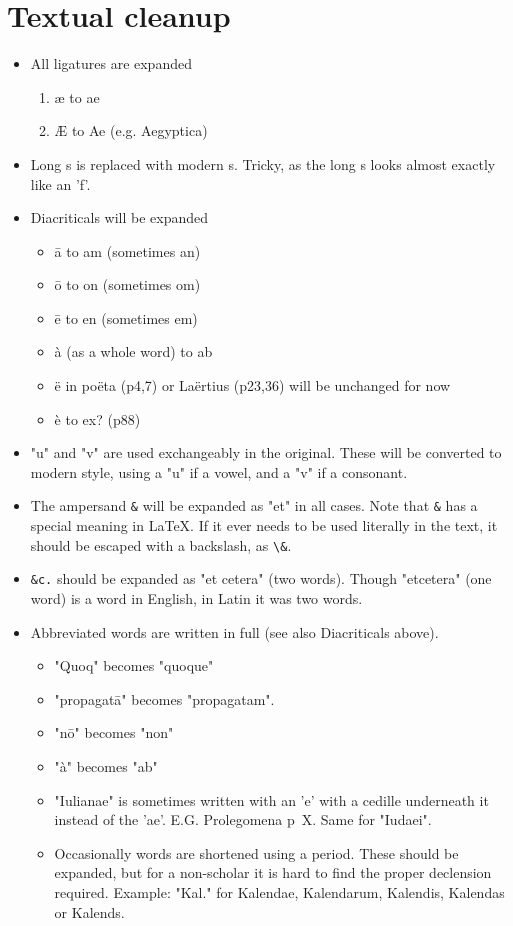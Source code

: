 \documentclass{report}
\begin{document}
\section{Textual cleanup}
\label{sec:textual_cleanup}
\begin{itemize}
\item All ligatures are expanded
	\begin{enumerate}
	\item æ to ae
	\item Æ to Ae (e.g. Aegyptica)
	\end{enumerate}

\item Long s is replaced with modern s. Tricky, as the long s looks almost
exactly like an 'f'.

\item Diacriticals will be expanded
	\begin{itemize}
	\item ā to am (sometimes an)
	\item ō to on (sometimes om)
	\item ē to en (sometimes em)
	\item à (as a whole word) to ab
	\item ë in poëta (p4,7) or Laërtius (p23,36) will be unchanged for now
	\item è to ex? (p88)
	\end{itemize}

\item "u" and "v" are used exchangeably in the original.
These will be converted to modern style,
 using a "u" if a vowel, and a "v" if a consonant.

\item The ampersand \verb+&+ will be expanded as "et" in all cases.
 Note that \verb+&+ has a special meaning in \LaTeX. If it ever needs to be
 used literally in the text, it should be escaped with a backslash, as
 \verb+\&+.

\item \verb+&c.+ should be expanded as "et cetera" (two words). Though
 "etcetera" (one word) is a word in English, in Latin it was two words.

\item Abbreviated words are written in full
 (see also Diacriticals above).
	\begin{itemize}
	\item "Quoq" becomes "quoque"
	\item "propagatā" becomes "propagatam".
	\item "nō" becomes "non"
	\item "à" becomes "ab"
	\item "Iulianae" is sometimes written with an 'e' with a cedille underneath
	 it instead of the 'ae'. E.G. Prolegomena p~X.
	 Same for "Iudaei".
	\item Occasionally words are shortened using a period. These should be
	expanded, but for a non-scholar it is hard to find the proper declension
	required.
	Example: "Kal." for Kalendae, Kalendarum, Kalendis, Kalendas or Kalends.
	\end{itemize}


\end{itemize}
\end{document}
